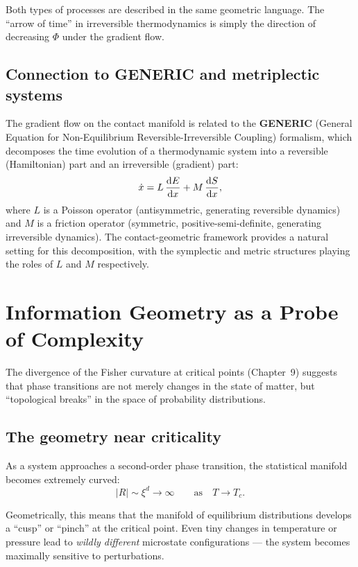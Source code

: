 Both types of processes are described in the same geometric language. The ``arrow of time'' in irreversible thermodynamics is simply the direction of decreasing $\Phi$ under the gradient flow.

\subsection{Connection to GENERIC and metriplectic systems}

The gradient flow on the contact manifold is related to the \textbf{GENERIC} (General Equation for Non-Equilibrium Reversible-Irreversible Coupling) formalism, which decomposes the time evolution of a thermodynamic system into a reversible (Hamiltonian) part and an irreversible (gradient) part:
\begin{equation}
\dot{x} = L\,\dv{E}{x} + M\,\dv{S}{x},
\end{equation}
where $L$ is a Poisson operator (antisymmetric, generating reversible dynamics) and $M$ is a friction operator (symmetric, positive-semi-definite, generating irreversible dynamics). The contact-geometric framework provides a natural setting for this decomposition, with the symplectic and metric structures playing the roles of $L$ and $M$ respectively.

\section{Information Geometry as a Probe of Complexity}

The divergence of the Fisher curvature at critical points (Chapter~9) suggests that phase transitions are not merely changes in the state of matter, but ``topological breaks'' in the space of probability distributions.

\subsection{The geometry near criticality}

As a system approaches a second-order phase transition, the statistical manifold becomes extremely curved:
\begin{equation}
|R| \sim \xi^d \to \infty \qquad \text{as} \quad T \to T_c.
\end{equation}

Geometrically, this means that the manifold of equilibrium distributions develops a ``cusp'' or ``pinch'' at the critical point. Even tiny changes in temperature or pressure lead to \emph{wildly different} microstate configurations --- the system becomes maximally sensitive to perturbations.

